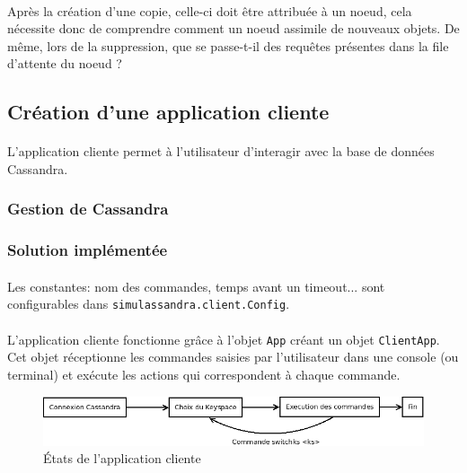 \documentclass[12pt]{article}
\newcommand{\class}[1]{\texttt{#1}}
\begin{document}
\paragraph{}Après la création d'une copie, celle-ci doit être attribuée à un noeud, cela nécessite donc de comprendre comment un noeud assimile de nouveaux objets. De même, lors de la suppression, que se passe-t-il des requêtes présentes dans la file d'attente du noeud ?

\subsection{Création d'une application cliente}

\paragraph{} L'application cliente permet à l'utilisateur d'interagir avec la base de données Cassandra.

\subsubsection{Gestion de Cassandra}

\subsubsection*{Solution implémentée}


\paragraph{} Les constantes: nom des commandes, temps avant un timeout... sont configurables dans \class{simulassandra.client.Config}.

\paragraph{}L'application cliente fonctionne grâce à l'objet \class{App} créant un objet \class{ClientApp}.
Cet objet réceptionne les commandes saisies par l'utilisateur dans une console (ou terminal) et exécute les actions qui correspondent à chaque commande.

\begin{figure}[h]
	\centering
		\includegraphics[width=13cm]{images/client/vie.png}
	\caption{États de l'application cliente \label{fig:vie}}
\end{figure}
\end{document}
